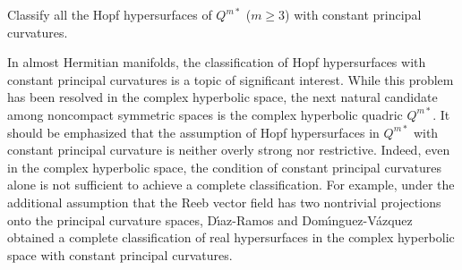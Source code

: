 \documentclass[reqno]{amsart}%
\theoremstyle{definition}
\numberwithin{equation}{section}
\begin{document}
\vskip 2mm

 Classify all the Hopf hypersurfaces of $Q^{m*}$ ($m\geq3$) with constant principal curvatures.

\vskip 2mm

In almost Hermitian manifolds, the classification of Hopf hypersurfaces with constant principal curvatures is a topic of significant interest. 
While this problem has been resolved in the complex hyperbolic space, the next natural candidate among noncompact symmetric spaces is the complex hyperbolic quadric $Q^{m*}$. It should be emphasized that the assumption of Hopf hypersurfaces in  $Q^{m*}$ with constant principal curvature is neither overly strong nor restrictive. Indeed, even in the complex hyperbolic space, the condition of constant principal curvatures alone is not sufficient to achieve a complete classification. For example, under the additional assumption that the Reeb vector field has two nontrivial projections onto the principal curvature spaces, 
D\'{\i}az-Ramos and Dom\'{\i}nguez-V\'{a}zquez \cite{DD1}  
obtained a complete classification of real hypersurfaces in the complex hyperbolic space with constant principal curvatures. 



\end{document}
